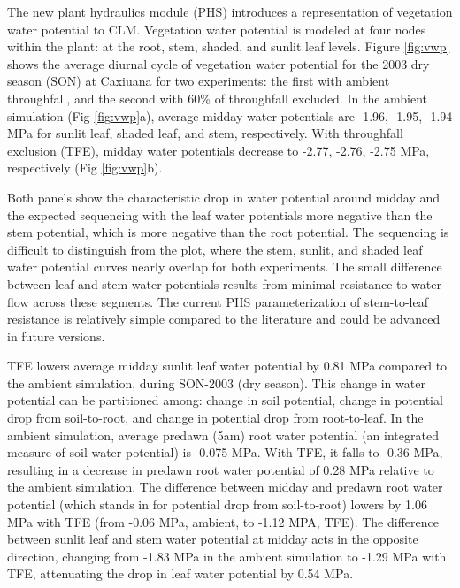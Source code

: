 \documentclass[draft,linenumbers]{agujournal}
\begin{document}
    The new plant hydraulics module (PHS) introduces a representation of vegetation water potential to CLM.
    Vegetation water potential is modeled at four nodes within the plant: at the root, stem, shaded, and sunlit leaf levels.
    Figure \ref{fig:vwp} shows the average diurnal cycle of vegetation water potential for the 2003 dry season (SON)
    at Caxiuana for two experiments: the first with ambient throughfall, and the second with 60\% of throughfall excluded. 
    In the ambient simulation (Fig \ref{fig:vwp}a), average midday water potentials are -1.96, -1.95, -1.94 MPa for sunlit leaf, shaded leaf, and stem, respectively.
    With throughfall exclusion (TFE), midday water potentials decrease to -2.77, -2.76, -2.75 MPa, respectively (Fig \ref{fig:vwp}b).
    
    Both panels show the characteristic drop in water potential around midday and the expected sequencing with 
    the leaf water potentials more negative than the stem potential, which is more negative than the root potential.
    The sequencing is difficult to distinguish from the plot, where the stem, sunlit, and shaded leaf water potential curves nearly overlap for both experiments. 
    The small difference between leaf and stem water potentials results from minimal resistance to water flow across these segments. 
    The current PHS parameterization of stem-to-leaf resistance is relatively simple compared to the literature \citep{franks2007} and could be advanced in future versions. 
    
    TFE lowers average midday sunlit leaf water potential by 0.81 MPa compared to the ambient simulation, during SON-2003 (dry season).
    This change in water potential can be partitioned among: change in soil potential, change in potential drop from soil-to-root, and change in potential drop from root-to-leaf. 
    In the ambient simulation, average predawn (5am) root water potential (an integrated measure of soil water potential) is -0.075 MPa. 
    With TFE, it falls to -0.36 MPa, resulting in a decrease in predawn root water potential of 0.28 MPa relative to the ambient simulation. 
    The difference between midday and predawn root water potential (which stands in for potential drop from soil-to-root) 
    lowers by 1.06 MPa with TFE (from -0.06 MPa, ambient, to -1.12 MPA, TFE).
    The difference between sunlit leaf and stem water potential at midday acts in the opposite direction, changing from
    -1.83 MPa in the ambient simulation to -1.29 MPa with TFE, attenuating the drop in leaf water potential by 0.54 MPa.
    
\end{document}
